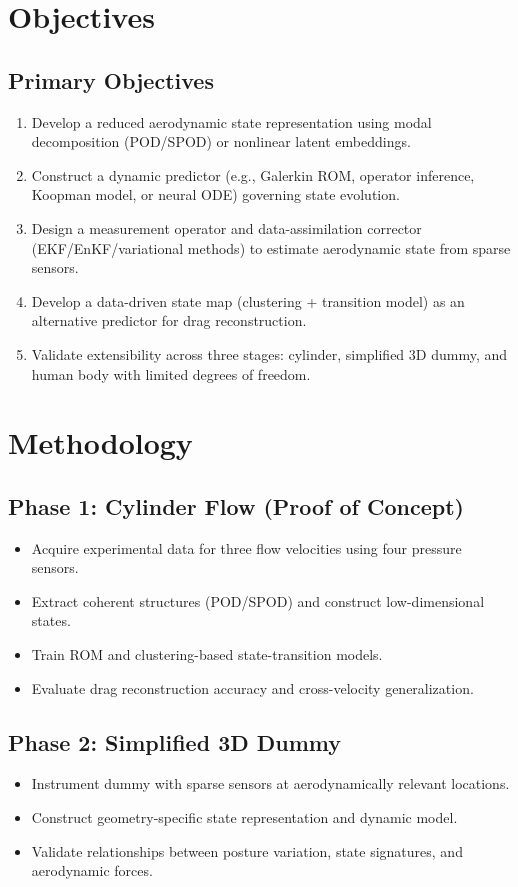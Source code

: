\documentclass[12pt]{article}
\begin{document}
\section{Objectives}
\subsection*{Primary Objectives}
\begin{enumerate}
    \item Develop a reduced aerodynamic state representation using modal decomposition (POD/SPOD) or nonlinear latent embeddings.
    \item Construct a dynamic predictor (e.g., Galerkin ROM, operator inference, Koopman model, or neural ODE) governing state evolution.
    \item Design a measurement operator and data-assimilation corrector (EKF/EnKF/variational methods) to estimate aerodynamic state from sparse sensors.
    \item Develop a data-driven state map (clustering + transition model) as an alternative predictor for drag reconstruction.
    \item Validate extensibility across three stages: cylinder, simplified 3D dummy, and human body with limited degrees of freedom.
\end{enumerate}

\section{Methodology}
\subsection{Phase 1: Cylinder Flow (Proof of Concept)}
\begin{itemize}
    \item Acquire experimental data for three flow velocities using four pressure sensors.
    \item Extract coherent structures (POD/SPOD) and construct low-dimensional states.
    \item Train ROM and clustering-based state-transition models.
    \item Evaluate drag reconstruction accuracy and cross-velocity generalization.
\end{itemize}

\subsection{Phase 2: Simplified 3D Dummy}
\begin{itemize}
    \item Instrument dummy with sparse sensors at aerodynamically relevant locations.
    \item Construct geometry-specific state representation and dynamic model.
    \item Validate relationships between posture variation, state signatures, and aerodynamic forces.
\end{itemize}
\end{document}
